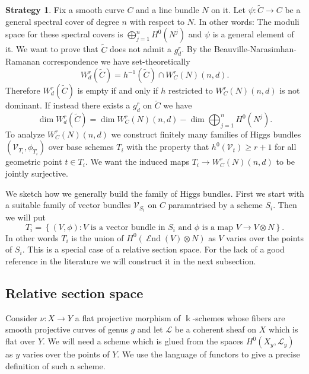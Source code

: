 \documentclass[12pt]{extarticle}
\theoremstyle{definition}
\newtheorem{strategy}[theorem]{Strategy}
\numberwithin{theorem}{section}
\newcommand{\cL}{\mathcal{L}}
\newcommand{\cV}{\mathcal{V}}
\DeclareMathOperator{\End}{\mathcal{E}nd}
\renewcommand{\tilde}{\widetilde}		%
\begin{document}
\begin{strategy}\label{strategy}
Fix a smooth curve $C$ and a line bundle $N$ on it. Let  $\psi: \tilde{C} \rightarrow C$ be a general spectral cover of degree $n$ with respect to $N$. In other words: The moduli space for these spectral covers is $\bigoplus_{j=1}^n H^0(N^j)$ and $\psi$ is a general element of it. We want to prove that $\tilde{C}$ does not admit a $g^r_d$. By the Beauville-Narasimhan-Ramanan correspondence we have set-theoretically
\begin{equation*}
	W^r_d(\tilde{C}) = h^{-1}(\tilde{C}) \cap W^r_C(N)(n,d).
\end{equation*}
Therefore $W^r_d(\tilde{C})$ is empty if and only if $h$ restricted to $W^r_C(N)(n,d)$ is not dominant.  If instead there exists a $g^r_d$ on $\tilde{C}$ we have 
\begin{equation*}
	\dim W^r_d(\tilde{C})  = \dim W^r_C(N)(n,d) - \dim \bigoplus_{j=1}^n H^0(N^j).
\end{equation*}
To analyze $W^r_C(N)(n,d)$ we construct finitely many families of Higgs bundles $(\cV_{T_i},\phi_{T_i})$ over base schemes $T_i$ with the property that $h^0(\cV_t) \geq r+1$ for all geometric point $t \in T_i$. We want the induced maps $T_i  \rightarrow W^r_C(N)(n,d)$ to be jointly surjective.

We sketch how we generally build the family of Higgs bundles. First we start with a suitable family of vector bundles $\cV_{S_i}$ on $C$ paramatrised by a scheme $S_i$. Then we will put 
\begin{equation*}
T_i = \left\{ (V,\phi): \text{$V$ is a vector bundle in $S_i$ and $\phi$ is a map $V \to V\otimes N$} \right\}.
\end{equation*} 
In other words $T_i$ is the union of $H^0(\End(V)\otimes N)$ as $V$ varies over the points of $S_i$. This is a special case of a relative section space. For the lack of a good reference in the literature we will construct it in the next subsection.
\end{strategy}
\subsection{Relative section space}\label{subsection:rel_section}
Consider $\nu: X\to Y$ a flat projective morphism of $\Bbbk$-schemes whose fibers are smooth projective curves of genus $g$ and let $\cL$ be a coherent sheaf on $X$ which is flat over $Y$. We will need a scheme which is glued from the spaces $H^0(X_y,\cL_y)$ as $y$ varies over the points of $Y$. We use the language of functors to give a precise definition of such a scheme.
\end{document}
